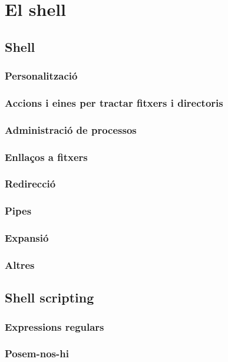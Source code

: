 \section{El shell}
\subsection{Shell}

\subsubsection{Personalització}

\subsubsection{Accions i eines per tractar fitxers i directoris}

\subsubsection{Administració de processos}

\subsubsection{Enllaços a fitxers}

\subsubsection{Redirecció}

\subsubsection{Pipes}

\subsubsection{Expansió}

\subsubsection{Altres}

\subsection{Shell scripting}

\subsubsection{Expressions regulars}

\subsubsection{Posem-nos-hi}
